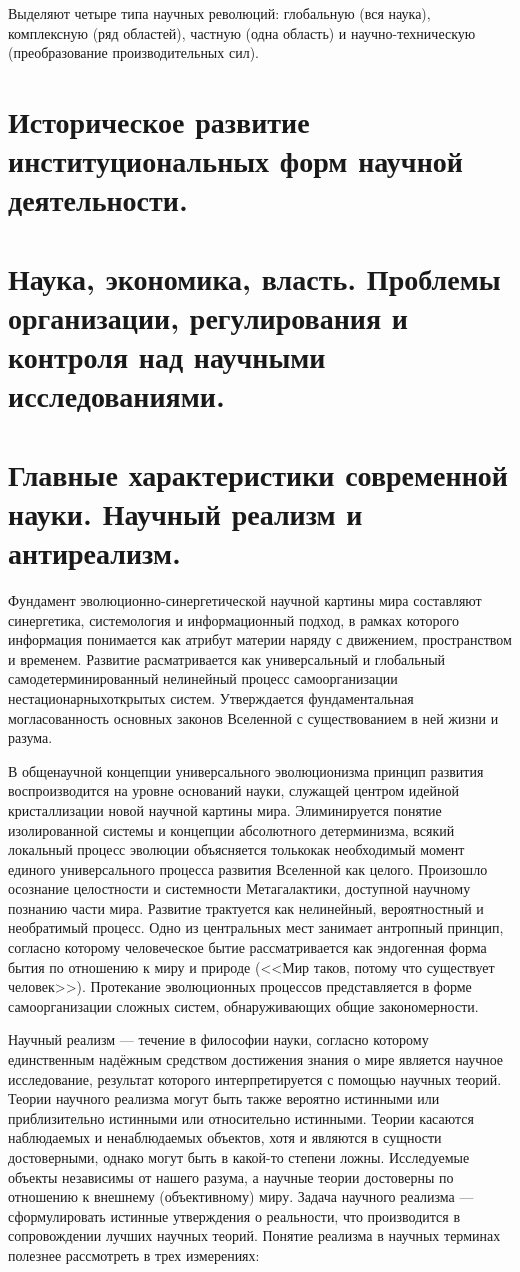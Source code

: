\documentclass[12pt, specialist, subf, substylefile = spbu.rtx]{disser}
\begin{document}
Выделяют четыре типа научных революций: глобальную (вся наука), комплексную (ряд областей), частную (одна область) и научно-техническую (преобразование производительных сил).

\section{Историческое развитие институциональных форм научной деятельности.}

\section{Наука, экономика, власть. Проблемы организации, регулирования и контроля над научными исследованиями.}

\section{Главные характеристики современной  науки. Научный реализм и антиреализм.}
Фундамент эволюционно-синергетической научной картины мира составляют синергетика, системология и информационный подход, в рамках которого информация понимается как атрибут материи наряду с движением, пространством и временем. Развитие расматривается как универсальный и глобальный самодетерминированный нелинейный процесс самоорганизации нестационарныхоткрытых систем. Утверждается фундаментальная могласованность основных законов Вселенной с существованием в ней жизни и разума.

В общенаучной концепции универсального эволюционизма принцип развития воспроизводится на уровне оснований науки, служащей центром идейной кристаллизации новой научной картины мира. Элиминируется понятие изолированной системы и концепции абсолютного детерминизма, всякий локальный процесс эволюции объясняется толькокак необходимый момент единого универсального процесса развития Вселенной как целого. Произошло осознание целостности и системности Метагалактики, доступной научному познанию части мира. Развитие трактуется как нелинейный, вероятностный и необратимый процесс. Одно из центральных мест занимает антропный принцип, согласно которому человеческое бытие рассматривается как эндогенная форма бытия по отношению к миру и природе (<<Мир таков, потому что существует человек>>). Протекание эволюционных процессов представляется в форме самоорганизации сложных систем, обнаруживающих общие закономерности.

Научный реализм — течение в философии науки, согласно которому единственным надёжным средством достижения знания о мире является научное исследование, результат которого интерпретируется с помощью научных теорий. Теории научного реализма могут быть также вероятно истинными или приблизительно истинными или относительно истинными. Теории касаются наблюдаемых и ненаблюдаемых объектов, хотя и являются в сущности достоверными, однако могут быть в какой-то степени ложны. Исследуемые объекты независимы от нашего разума, а научные теории достоверны по отношению к внешнему (объективному) миру. Задача научного реализма — сформулировать истинные утверждения о реальности, что производится в сопровождении лучших научных теорий. Понятие реализма в научных терминах полезнее рассмотреть в трех измерениях:
\end{document}
